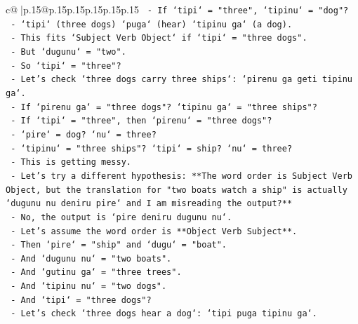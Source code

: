 \documentclass{article}
\begin{document}
{\begin{supertabular}{c@{$\;$}|p{.15\linewidth}@{}p{.15\linewidth}p{.15\linewidth}p{.15\linewidth}p{.15\linewidth}p{.15\linewidth}}
{{{\texttt{                               {-} If `tipi` = "three", `tipinu` = "dog"?} \\
\texttt{                               {-} `tipi` (three dogs) `puga` (hear) `tipinu ga` (a dog).} \\
\texttt{                               {-} This fits `Subject Verb Object` if `tipi` = "three dogs".} \\
\texttt{                               {-} But `dugunu` = "two".} \\
\texttt{                               {-} So `tipi` = "three"?} \\
\texttt{                               {-} Let's check `three dogs carry three ships`: `pirenu ga geti tipinu ga`.} \\
\texttt{                                 {-} If `pirenu ga` = "three dogs"? `tipinu ga` = "three ships"?} \\
\texttt{                                 {-} If `tipi` = "three", then `pirenu` = "three dogs"?} \\
\texttt{                                 {-} `pire` = dog? `nu` = three?} \\
\texttt{                                 {-} `tipinu` = "three ships"? `tipi` = ship? `nu` = three?} \\
\texttt{                                 {-} This is getting messy.} \\
\texttt{                           {-} Let's try a different hypothesis: **The word order is Subject Verb Object, but the translation for "two boats watch a ship" is actually `dugunu nu deniru pire` and I am misreading the output?**} \\
\texttt{                           {-} No, the output is `pire deniru dugunu nu`.} \\
\texttt{                           {-} Let's assume the word order is **Object Verb Subject**.} \\
\texttt{                           {-} Then `pire` = "ship" and `dugu` = "boat".} \\
\texttt{                           {-} And `dugunu nu` = "two boats".} \\
\texttt{                           {-} And `gutinu ga` = "three trees".} \\
\texttt{                           {-} And `tipinu nu` = "two dogs".} \\
\texttt{                           {-} And `tipi` = "three dogs"?} \\
\texttt{                           {-} Let's check `three dogs hear a dog`: `tipi puga tipinu ga`.} \\
}}}
\end{supertabular}}
\end{document}
